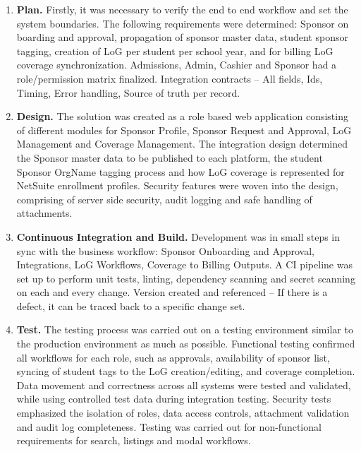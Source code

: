     \begin{enumerate}

        \item \textbf{Plan.} Firstly, it was necessary to verify the end to end workflow and set the system boundaries. The following requirements were determined: Sponsor on boarding and approval, propagation of sponsor master data, student sponsor tagging, creation of LoG per student per school year, and for billing LoG coverage synchronization. Admissions, Admin, Cashier and Sponsor had a role/permission matrix finalized. Integration contracts – All fields, Ids, Timing, Error handling, Source of truth per record. 
        
        \item \textbf{Design.} The solution was created as a role based web application consisting of different modules for Sponsor Profile, Sponsor Request and Approval, LoG Management and Coverage Management. The integration design determined the Sponsor master data to be published to each platform, the student Sponsor OrgName tagging process and how LoG coverage is represented for NetSuite enrollment profiles. Security features were woven into the design, comprising of server side security, audit logging and safe handling of attachments. 
        
        \item \textbf{Continuous Integration and Build.} Development was in small steps in sync with the business workflow: Sponsor Onboarding and Approval, Integrations, LoG Workflows, Coverage to Billing Outputs. A CI pipeline was set up to perform unit tests, linting, dependency scanning and secret scanning on each and every change. Version created and referenced – If there is a defect, it can be traced back to a specific change set.
    
        \item \textbf{Test.} The testing process was carried out on a testing environment similar to the production environment as much as possible. Functional testing confirmed all workflows for each role, such as approvals, availability of sponsor list, syncing of student tags to the LoG creation/editing, and coverage completion. Data movement and correctness across all systems were tested and validated, while using controlled test data during integration testing. Security tests emphasized the isolation of roles, data access controls, attachment validation and audit log completeness. Testing was carried out for non-functional requirements for search, listings and modal workflows.
    

\end{enumerate}
